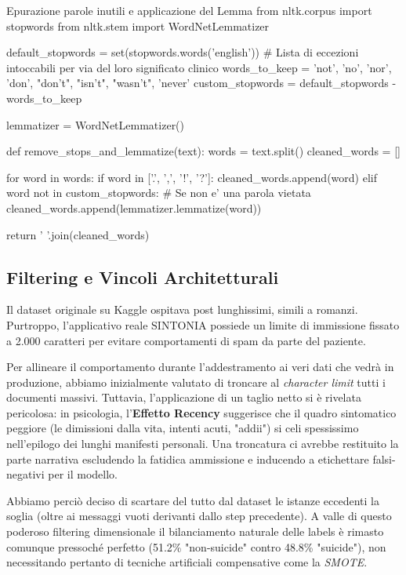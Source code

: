 \begin{codebox}{Epurazione parole inutili e applicazione del Lemma}
from nltk.corpus import stopwords
from nltk.stem import WordNetLemmatizer

default_stopwords = set(stopwords.words('english'))
# Lista di eccezioni intoccabili per via del loro significato clinico
words_to_keep = {'not', 'no', 'nor', 'don', "don't", "isn't", "wasn't", 'never'}
custom_stopwords = default_stopwords - words_to_keep

lemmatizer = WordNetLemmatizer()

def remove_stops_and_lemmatize(text):
    words = text.split()
    cleaned_words = []
    
    for word in words:
        if word in ['.', ',', '!', '?']:
            cleaned_words.append(word)
        elif word not in custom_stopwords: # Se non e' una parola vietata
            cleaned_words.append(lemmatizer.lemmatize(word))
            
    return ' '.join(cleaned_words)
\end{codebox}

\subsection{Filtering e Vincoli Architetturali}
Il dataset originale su Kaggle ospitava post lunghissimi, simili a romanzi. Purtroppo, l'applicativo reale SINTONIA possiede un limite di immissione fissato a 2.000 caratteri per evitare comportamenti di spam da parte del paziente. 

Per allineare il comportamento durante l'addestramento ai veri dati che vedrà in produzione, abbiamo inizialmente valutato di troncare al \textit{character limit} tutti i documenti massivi. Tuttavia, l'applicazione di un taglio netto si è rivelata pericolosa: in psicologia, l'\textbf{Effetto Recency} suggerisce che il quadro sintomatico peggiore (le dimissioni dalla vita, intenti acuti, "addii") si celi spessissimo nell'epilogo dei lunghi manifesti personali. Una troncatura ci avrebbe restituito la parte narrativa escludendo la fatidica ammissione e inducendo a etichettare falsi-negativi per il modello.

Abbiamo perciò deciso di scartare del tutto dal dataset le istanze eccedenti la soglia (oltre ai messaggi vuoti derivanti dallo step precedente). A valle di questo poderoso filtering dimensionale il bilanciamento naturale delle labels è rimasto comunque pressoché perfetto (51.2\% "non-suicide" contro 48.8\% "suicide"), non necessitando pertanto di tecniche artificiali compensative come la \textit{SMOTE}.

